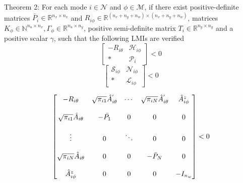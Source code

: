 \documentclass[conference]{IEEEtran}
\begin{document}
Theorem 2: For each mode $i\in\mathcal{N}$ and $\phi\in\mathcal{M}$, if there exist positive-definite matrices $\bar{P}_{i}\in\mathbb{R}^{n_x\times n_x}$ and $R_{i\phi}\in \mathbb{R}^{(n_x+n_y+n_w)\times(n_x+n_y+n_w)}$, matrices $K_{\phi}\in\mathbb{N}^{n_u\times n_x}, \varGamma_{\phi}\in \mathbb{R}^{n_u\times n_y}$, positive semi-definite matrix $T_{i}\in\mathbb{R}^{n_y\times n_y}$ and a positive scalar $\gamma$, such that the following LMIs are verified
\begin{equation} \label{condition_2_1}
	\begin{bmatrix}
	-R_{i\theta}&\mathscr{H}_{i\phi}\\
	*&\mathscr{P}_{i}
	\end{bmatrix}<0
\end{equation}
\begin{equation} \label{condition_2_2}
	\begin{bmatrix}
	\mathscr{S}_{i\phi}&\mathscr{N}_{i\phi}\\
	*&\mathscr{L}_{i\phi}
	\end{bmatrix}<0
\end{equation}

\begin{equation}\notag
\begin{bmatrix}
-R_{i\theta}&\sqrt{\pi_{i1}}\hat{A}^{'}_{i\theta}&\cdots&\sqrt{\pi_{iN}}\hat{A}^{'}_{i\theta}&\hat{A}^{z}_{i\phi} \\ \\
\sqrt{\pi_{i1}}\hat{A}_{i\theta}&-\bar{P_1}&0&0&0\\ \\
\vdots &0&\ddots&0&0\\ \\
\sqrt{\pi_{iN}}\hat{A}_{i\theta}&0&0& -\bar{P}_{N}&0\\ \\
\hat{A}^{z}_{i\phi}&0&0&0&-I_{n_w}
\end{bmatrix}<0
\end{equation}
\end{document}

